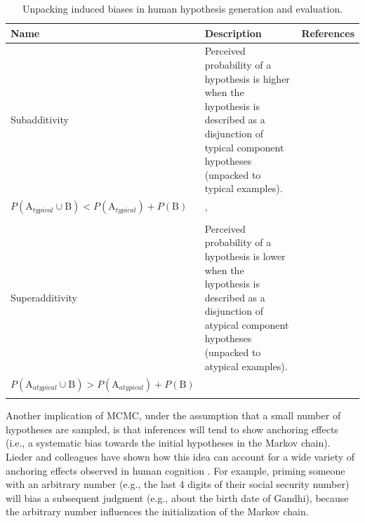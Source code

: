 \begin{table}%
\centering
\caption{Unpacking induced biases in human hypothesis generation and evaluation.}
\label{tab:biases}
\begin{tabular}{p{}>{\raggedright}p{}p{}}
\toprule
\textbf{Name}&\textbf{Description}& \textbf{References}\\
\midrule
Subadditivity& Perceived probability of a hypothesis is higher when the hypothesis is described as a disjunction of typical component hypotheses (unpacked to typical examples). \\
$P (\text{A}_{typical} \cup \text{B}) < P (\text{A}_{typical}) + P(\text{B})$ & \cite{fox1998belief}, \cite{tversky94} \\\\
Superadditivity& Perceived probability of a hypothesis is lower when the hypothesis is described as a disjunction of atypical component hypotheses (unpacked to atypical examples). \\
$P (\text{A}_{atypical} \cup \text{B}) > P (\text{A}_{atypical}) + P(\text{B})$ & \cite{sloman04,hadjichristidis1999opening} \\\\ 
\bottomrule
\end{tabular}
\end{table}

Another implication of MCMC, under the assumption that a small number of hypotheses are sampled, is that inferences will tend to show anchoring effects (i.e., a systematic bias towards the initial hypotheses in the Markov chain). Lieder and colleagues have shown how this idea can account for a wide variety of anchoring effects observed in human cognition \citep{lieder2012burn,lieder2017empirical}. For example, priming someone with an arbitrary number (e.g., the last 4 digits of their social security number) will bias a subsequent judgment (e.g., about the birth date of Gandhi), because the arbitrary number influences the initialization of the Markov chain.


